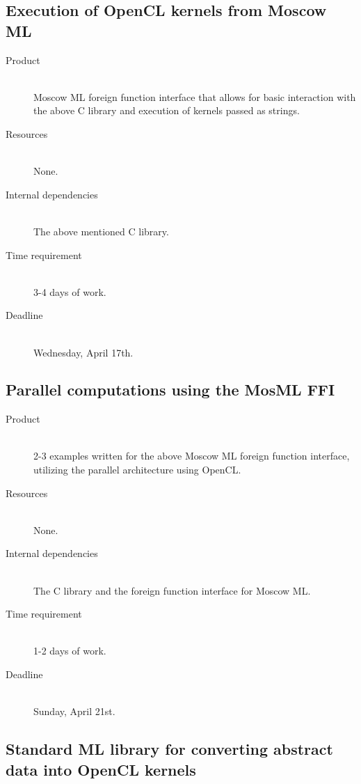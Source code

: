 \documentclass[a4paper, 10pt]{article}
\begin{document}
\subsection{Execution of OpenCL kernels from Moscow ML}
\label{sec:mosmlffi}

\begin{description}
  \item[Product] \hfill \\
    Moscow ML foreign function interface that allows for basic
    interaction with the above C library and execution of kernels
    passed as strings.
  \item[Resources] \hfill \\
    None.
  \item[Internal dependencies] \hfill \\
    The above mentioned C library.
  \item[Time requirement] \hfill \\
    3-4 days of work.
  \item[Deadline] \hfill \\
    Wednesday, April 17th.
\end{description}

\subsection{Parallel computations using the MosML FFI}

\begin{description}
  \item[Product] \hfill \\
    2-3 examples written for the above Moscow ML foreign function
    interface, utilizing the parallel architecture using OpenCL.
  \item[Resources] \hfill \\
    None.
  \item[Internal dependencies] \hfill \\
    The C library and the foreign function interface for Moscow ML.
  \item[Time requirement] \hfill \\
    1-2 days of work.
  \item[Deadline] \hfill \\
    Sunday, April 21st.
\end{description}

\subsection{Standard ML library for converting abstract data into
  OpenCL kernels}
\end{document}
